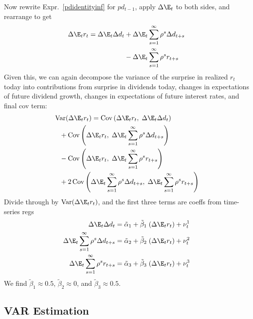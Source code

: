 \documentclass[12pt]{article}
\theoremstyle{plain}
\theoremstyle{definition}
\theoremstyle{remark}
\newcommand{\Cov}{\operatorname{Cov}}
\newcommand{\Var}{\operatorname{Var}}
\begin{document}
\begin{multicols*}{2}
Now rewrite Expr.~\ref{pdidentityinf} for $pd_{t-1}$, apply $\Delta
\E_t$ to both sides, and rearrange to get
\begin{align}
  \Delta\E_tr_{t}
  =
  \Delta \E_t\Delta d_{t}
  &+ \Delta \E_t \sum_{s=1}^\infty \rho^{s}\Delta d_{t+s}
  \label{rsurprise}
  \\
  &- \Delta \E_t \sum_{s=1}^\infty \rho^{s}r_{t+s}
  \notag
\end{align}
Given this, we can again decompose the variance of the surprise in
realized $r_t$ today into contributions from surprise in dividends
today, changes in expectations of future dividend growth, changes in
expectations of future interest rates, and final cov term:
\begin{align}
  &\Var(\Delta\E_tr_t)
  =
  \Cov\left(
    \Delta \E_{t}r_{t},\;
    \Delta \E_{t}\Delta d_{t}
  \right)
  \label{decompsurprise}
  \\
  &\;\;\;
  +\Cov\left(
    \Delta \E_{t}r_{t},\;
    \Delta \E_{t}
    \sum_{s=1}^\infty
    \rho^{s}\Delta d_{t+s}
  \right)
  \notag
  \\
  &\;\;\;
  -\Cov\left(
    \Delta \E_{t}r_{t},\;
    \Delta \E_{t}
    \sum_{s=1}^\infty
    \rho^{s}r_{t+s}
  \right)
  \notag
  \\
  &\;\;\;
  +2\Cov\left(
    \Delta \E_{t}
    \sum_{s=1}^\infty
    \rho^{s}\Delta d_{t+s}
    ,\;
    \Delta \E_{t}
    \sum_{s=1}^\infty
    \rho^{s}r_{t+s}
  \right)
  \notag
\end{align}
Divide through by $\Var(\Delta \E_tr_t)$, and the first three terms are
coeffs from time-series regs
\begin{align*}
  \Delta \E_{t}\Delta d_{t}
  &=
    \tilde{\alpha}_{1}
    + \tilde{\beta}_{1} \; (\Delta \E_{t}r_{t})
    + \nu_t^{1} \\
  \Delta \E_{t}
  \sum_{s=1}^\infty
  \rho^{s}\Delta d_{t+s}
  &=
    \tilde{\alpha}_{2}
    + \tilde{\beta}_{2} \; (\Delta \E_{t}r_{t})
    + \nu_t^{2} \\
  \Delta \E_{t}
  \sum_{s=1}^\infty
  \rho^{s}r_{t+s}
  &=
    \tilde{\alpha}_{3}
    + \tilde{\beta}_{3} \; (\Delta \E_{t}r_{t})
    + \nu_t^{3}
\end{align*}
We find $\tilde{\beta}_1\approx 0.5$, $\tilde{\beta}_2\approx 0$, and
$\tilde{\beta}_3\approx 0.5$.


\clearpage
\subsection{VAR Estimation}


\end{multicols*}
\end{document}
